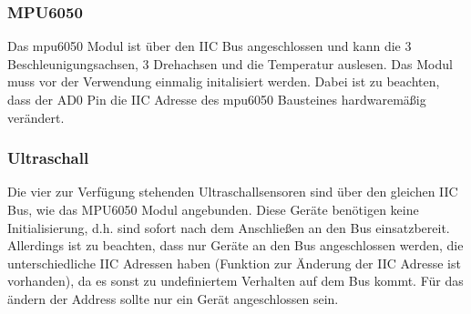 \subsubsection{MPU6050}
Das mpu6050 Modul ist über den IIC Bus angeschlossen und kann die 3 Beschleunigungsachsen, 3 Drehachsen und die Temperatur auslesen. Das Modul muss vor der Verwendung einmalig initalisiert werden. Dabei ist zu beachten, dass der AD0 Pin die IIC Adresse des mpu6050 Bausteines hardwaremäßig verändert. 
\subsubsection{Ultraschall}
Die vier zur Verfügung stehenden Ultraschallsensoren sind über den gleichen IIC Bus, wie das MPU6050 Modul angebunden. Diese Geräte benötigen keine Initialisierung, d.h. sind sofort nach dem Anschließen an den Bus einsatzbereit. Allerdings ist zu beachten, dass nur Geräte an den Bus angeschlossen werden, die unterschiedliche IIC Adressen haben (Funktion zur Änderung der IIC Adresse ist vorhanden), da es sonst zu undefiniertem Verhalten auf dem Bus kommt. Für das ändern der Address sollte nur ein Gerät angeschlossen sein.

